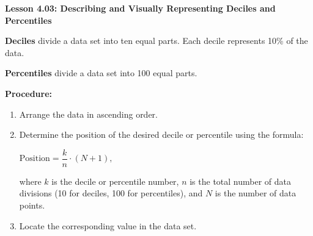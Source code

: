 \begin{center}
\textbf{Lesson 4.03: Describing and Visually Representing Deciles and Percentiles}
\end{center}

\vspace*{-1.5ex}

\noindent \textbf{Deciles} divide a data set into ten equal parts. Each decile represents 10\% of the data.  

\noindent \textbf{Percentiles} divide a data set into 100 equal parts.  


\noindent\textbf{Procedure:}  
\begin{enumerate}
    \item Arrange the data in ascending order.  
    \item Determine the position of the desired decile or percentile using the formula:  

      {\centering $ \text{Position} = \dfrac{k}{n} \cdot (N + 1), $\par}
      
    where \(k\) is the decile or percentile number, \(n\) is the total number of data divisions (10 for deciles, 100 for percentiles), and \(N\) is the number of data points.  
    \item Locate the corresponding value in the data set.  
\end{enumerate} 
